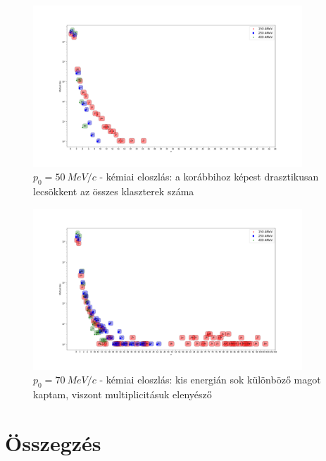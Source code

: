 \documentclass[a4paper,12pt]{article}
\begin{document}
\begin{figure}[H]
\begin{minipage}{\textwidth}
\centering
\includegraphics[width=0.9\textwidth]{./chemical_005.png}
\caption{$p_{0} = 50 ~MeV/c$ - kémiai eloszlás: a korábbihoz képest drasztikusan lecsökkent az összes klaszterek száma}
\end{minipage}
\end{figure}
\begin{figure}[H]
\begin{minipage}{\textwidth}
\centering
\includegraphics[width=0.9\textwidth]{./chemical_007.png}
\caption{$p_{0} = 70 ~MeV/c$ - kémiai eloszlás: kis energián sok különböző magot kaptam, viszont multiplicitásuk elenyésző}
\end{minipage}
\end{figure}

\vspace{5mm}

\section{ Összegzés}

\vspace{5mm}
\end{document}
